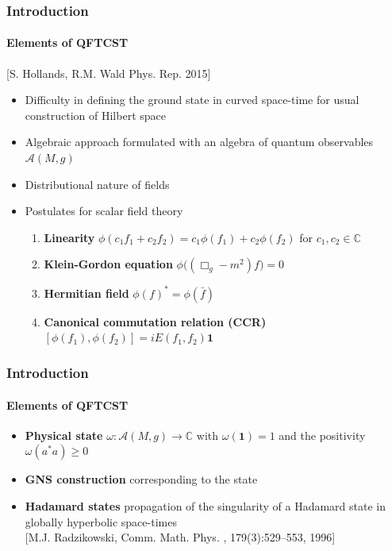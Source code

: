 \documentclass[french]{beamer}
\begin{document}
\begin{frame}
\frametitle{Introduction}
\framesubtitle{Elements of QFTCST}

\color{blue}[S. Hollands, R.M. Wald Phys. Rep. 2015]

\begin{itemize}


\item Difficulty in defining the ground state in curved space-time for usual construction of Hilbert space
\item Algebraic approach formulated with an algebra of quantum observables $\mathscr{A}(M,g)$
\item Distributional nature of fields
\item Postulates for scalar field theory
 \begin{enumerate}
  \item \textbf{Linearity} $\phi(c_1 f_1 + c_2 f_2) = c_1 \phi(f_1) + c_2 \phi(f_2)$ for $c_1, c_2 \in \mathbb{C}$
%
\item \textbf{Klein-Gordon equation} $\phi\big( (\Box_g - m^2)f \big) = 0$
%
\item \textbf{Hermitian field} $\phi(f)^* = \phi(\bar{f})$
%
\item \textbf{Canonical commutation relation (CCR)} $[\phi(f_1), \phi(f_2)] = iE(f_1, f_2) \mathbf{1}$
 \end{enumerate}
\end{itemize}

\end{frame}
\begin{frame}
\frametitle{Introduction}
\framesubtitle{Elements of QFTCST}
\begin{itemize}

\item \textbf{Physical state} $\omega: \mathscr{A}(M,g) \rightarrow \mathbb{C}$ with $\omega(\mathbf{1}) = 1$ and the positivity $\omega(a^*a) \geq 0$

\item \textbf{GNS construction} corresponding to the state 

\item \textbf{Hadamard states} propagation of the singularity of a Hadamard state in globally hyperbolic space-times
\\
\color{blue}[M.J. Radzikowski, Comm. Math. Phys.
, 179(3):529–553, 1996] \color{black}



\end{itemize}

\end{frame}
\end{document}
